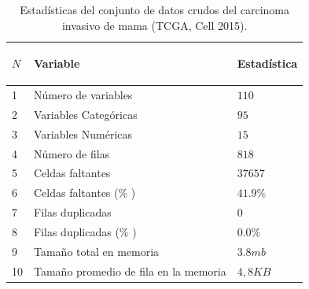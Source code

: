 \begin{table}[!htb]
	\footnotesize
	\centering
	\begin{threeparttable}
		\begin{tabular}{p{0.5cm} p{7cm} p{2cm}} \toprule
			\begin{center}$N$\end{center}   
			&\begin{center}Variable\end{center}       
			&\begin{center}Estadística\end{center}  
			\\ \hline
			1
			& Número de variables
			& $110$
			\\ \hline
			2
			& Variables Categóricas
			& $95$
			\\ \hline
			
			3
			& Variables Numéricas
			& $15$
			\\ \hline
			
			4
			& Número de filas
			& 	$818$
			\\ \hline
			5
			& Celdas faltantes
			& $37657$
			
			\\ \hline
			6
			& Celdas faltantes (\% )
			& $41.9\%$
			
			\\ \hline
			7
			& Filas duplicadas 
			& $0$
			
			\\ \hline
			8
			& Filas duplicadas (\% )
			& $0.0\%$
			
			\\ \hline
			9
			& Tamaño total en memoria
			& $3.8 mb$
			
			\\ \hline
			10
			& Tamaño promedio de fila en la memoria
			& $	4,8 KB$
			\\ \hline	
		\end{tabular}
		\caption{Estadísticas del conjunto de datos crudos del carcinoma invasivo de mama (TCGA, Cell 2015).}
		\label{dataset_Statistics}
	\end{threeparttable}
\end{table}

